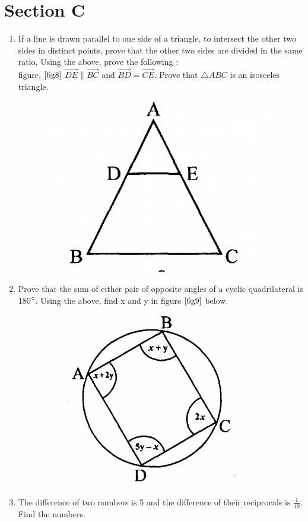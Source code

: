 \documentclass[journal,12pt,twocolumn]{IEEEtran}
\renewcommand\thesection{\arabic{section}}
\begin{document}
\section{Section C}
\renewcommand{\theequation}{\theenumi}
\begin{enumerate}[label=\thesection.\arabic*.,ref=\thesection.\theenumi]
\item If a line is drawn parallel to one side of a triangle, to intersect the other two sides in distinct points, prove that the other two sides are divided in the same ratio. Using the above, prove the following :\\ figure, $\ref{fig8}$ $\vec{DE} \| \vec{BC}$ and $\vec{BD}=\vec{CE}$. Prove that $\triangle{ABC}$ is an isosceles triangle.
\begin{figure}[h!]
	\centering
    \includegraphics[width=0.5\columnwidth,center]{./fig/8.png}
    \caption{}
    \label{fig8}
\end{figure}
 
 \item Prove that the sum of either pair of opposite angles of a cyclic quadrilateral is 180$\degree$. Using the above, find x and y in figure $\ref{fig9}$ below.
 \begin{figure}[h!]
	\centering
    \includegraphics[width=0.5\columnwidth,center]{./fig/9.png}
    \caption{}
    \label{fig9}
\end{figure}
 
 \item The difference of two numbers is 5 and the difference of their reciprocals is $\displaystyle\frac{1}{10}$. Find the numbers.
 

\end{enumerate}
\end{document}
